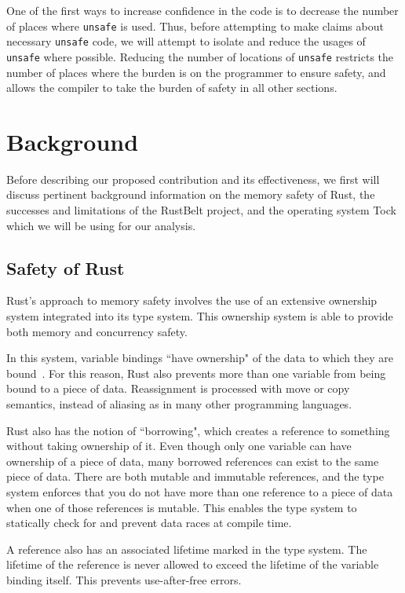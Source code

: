 \documentclass[12pt]{article}
\begin{document}
One of the first ways to increase confidence in the code is to decrease the number of places where \texttt{unsafe} is used. Thus, before attempting to make claims about necessary \texttt{unsafe} code, we will attempt to isolate and reduce the usages of \texttt{unsafe} where possible. Reducing the number of locations of \texttt{unsafe} restricts the number of places where the burden is on the programmer to ensure safety, and allows the compiler to take the burden of safety in all other sections.

\section{Background}
Before describing our proposed contribution and its effectiveness, we first will discuss pertinent background information on the memory safety of Rust, the successes and limitations of the RustBelt project, and the operating system Tock~\cite{levy2017tock} which we will be using for our analysis.

\subsection{Safety of Rust}
Rust's approach to memory safety involves the use of an extensive ownership system integrated into its type system. This ownership system is able to provide both memory and concurrency safety. 

In this system, variable bindings ``have ownership" of the data to which they are bound~\cite{rust_book}.
For this reason, Rust also prevents more than one variable from being bound to a piece of data. Reassignment is processed with move or copy semantics, instead of aliasing as in many other programming languages.

Rust also has the notion of ``borrowing", which creates a reference to something without taking ownership of it. Even though only one variable can have ownership of a piece of data, many borrowed references can exist to the same piece of data. There are both mutable and immutable references, and the type system enforces that you do not have more than one reference to a piece of data when one of those references is mutable. This enables the type system to statically check for and prevent data races at compile time.

A reference also has an associated lifetime marked in the type system. The lifetime of the reference is never allowed to exceed the lifetime of the variable binding itself. This prevents use-after-free errors.
\end{document}

